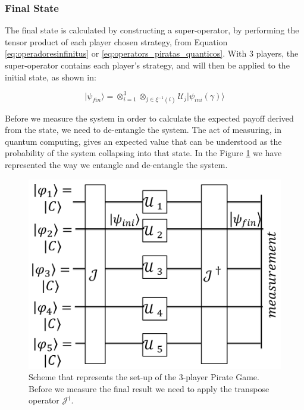 \documentclass[10pt]{llncs}
\begin{document}
\subsubsection{Final State}
\label{subsec:pirates_finalstate}


The final state is calculated by constructing a super-operator, by performing the tensor product of each player chosen strategy, from Equation \eqref{eq:operadoresinfinitus} or \eqref{eq:operators_piratas_quanticos}. With 3 players, the super-operator contains each player's strategy, and will then be applied to the initial state, as shown in:

\begin{equation}
\vert\psi_{fin}\rangle=\otimes_{i=1}^{3}\otimes_{j\in\xi^{-1}(i)}\mathcal{U}_{j}\vert\psi_{ini}(\gamma)\rangle
\label{eq:piratas_final_move}
\end{equation}


Before we measure the system in order to calculate the expected payoff derived from the state, we need to de-entangle the system. The act of measuring, in quantum computing, gives an expected value that can be understood as the probability of the system collapsing into that state. In the Figure \ref{fig:pg_architecture3players} we have represented the way we entangle and de-entangle the system.

\begin{figure}[h]
\centering 
\includegraphics[scale=0.14]{Figures/architecture/esquema/esquema.png}
\caption{Scheme that represents the set-up of the $3$-player Pirate Game. Before we measure the final result we need to apply the transpose operator $\mathcal{J}^{\dagger}$. }
\label{fig:pg_architecture3players}
\end{figure}
\end{document}

